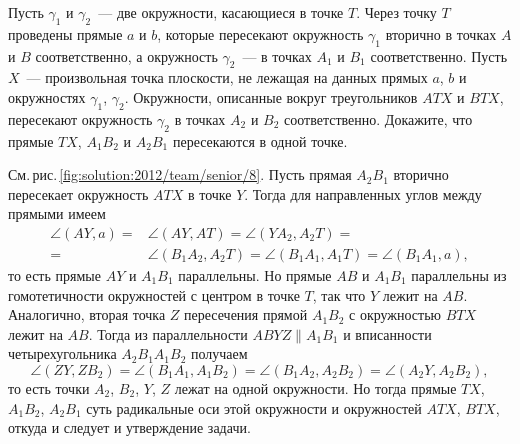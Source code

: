\problem{}
Пусть $\gamma_1$ и $\gamma_2$~--- две окружности, касающиеся в точке $T$.
Через точку $T$ проведены прямые $a$ и $b$, которые пересекают окружность $\gamma_1$ вторично в точках $A$ и $B$
соответственно, а окружность $\gamma_2$~--- в точках $A_1$ и $B_1$
соответственно.
Пусть $X$~--- произвольная точка плоскости, не лежащая на данных прямых $a$, $b$ и окружностях $\gamma_1$, $\gamma_2$.
Окружности, описанные вокруг треугольников $ATX$ и $BTX$, пересекают окружность $\gamma_2$ в точках $A_2$ и $B_2$ соответственно.
Докажите, что прямые $TX$, $A_1B_2$ и $A_2B_1$ пересекаются в одной точке.

%
\label{solution:2012/team/senior/8}%
См.\,рис.\,\ref{fig:solution:2012/team/senior/8}.
Пусть прямая $A_2 B_1$ вторично пересекает окружность $ATX$ в точке $Y$.
Тогда для направленных углов между прямыми имеем 
\begin{align*}
    \angle (AY, a)
={}&
    \angle (AY, AT)
=
    \angle (Y A_2, A_2 T)
=\\={}&
    \angle (B_1 A_2, A_2 T)
=
    \angle (B_1 A_1, A_1 T)
=
    \angle (B_1 A_1, a)
,\end{align*}
то есть прямые $AY$ и $A_1 B_1$ параллельны.
Но прямые $AB$ и $A_1 B_1$ параллельны из гомотетичности окружностей с центром
в точке $T$, так что $Y$ лежит на $AB$.
Аналогично, вторая точка $Z$ пересечения прямой $A_1 B_2$ с окружностью $BTX$
лежит на $AB$.
Тогда из параллельности $ABYZ \parallel A_1 B_1$ и вписанности четырехугольника
$A_2 B_1 A_1B_2$ получаем
\[
    \angle (ZY, ZB_2)
=
    \angle (B_1A_1,A_1B_2)
=
    \angle (B_1A_2,A_2B_2)
=
    \angle (A_2Y,A_2B_2)
,\]
то есть точки $A_2$, $B_2$, $Y$, $Z$ лежат на одной окружности.
Но тогда прямые $TX$, $A_1B_2$, $A_2B_1$ суть радикальные оси этой окружности и
окружностей $ATX$, $BTX$, откуда и следует и утверждение задачи.

\endproblem
